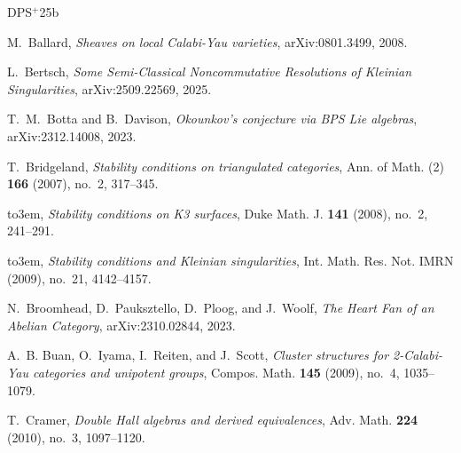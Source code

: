 \documentclass[reqno,a4paper]{amsart}
\theoremstyle{basic-theorem}
\numberwithin{equation}{section}
\begin{document}
\newcommand{\etalchar}[1]{$^{#1}$}
\providecommand{\noopsort}[1]{}
\providecommand{\bysame}{\leavevmode\hbox to3em{\hrulefill}\thinspace}
\providecommand{\href}[2]{#2}
\begin{thebibliography}{DPS{\etalchar{+}}25b}
	
	M.~Ballard, \textit{Sheaves on local {C}alabi-{Y}au varieties},
	\href{https://arxiv.org/pdf/0801.3499.pdf}{\sf arXiv:0801.3499}, 2008.
	
	L.~Bertsch, \textit{Some {{Semi-Classical Noncommutative Resolutions}} of
		{{Kleinian Singularities}}}, \href{https://arxiv.org/pdf/2509.22569.pdf}{\sf
		arXiv:2509.22569}, 2025.
		
	T.~M.~Botta and B.~Davison, \textit{Okounkov's conjecture via BPS Lie algebras},
	\href{https://arxiv.org/abs/2312.14008}{\sf arXiv:2312.14008}, 2023.	
		
	T.~Bridgeland, \textit{Stability conditions on triangulated categories}, Ann. of
	Math. (2) \textbf{166} (2007), no.~2, 317--345.
	
	\bysame, \textit{Stability conditions on {{K3}} surfaces}, Duke Math. J.
	\textbf{141} (2008), no.~2, 241--291.
	
	\bysame, \textit{Stability conditions and {K}leinian singularities}, Int.
	Math. Res. Not. IMRN (2009), no.~21, 4142--4157.
	
	
	N.~Broomhead, D.~Pauksztello, D.~Ploog, and J.~Woolf, \textit{The {H}eart {F}an
	of an {A}belian {C}ategory}, \href{https://arxiv.org/abs/2310.02844}{\sf
	arXiv:2310.02844}, 2023.
		
	A.~B. Buan, O.~Iyama, I.~Reiten, and J.~Scott, \textit{Cluster structures for
		2-{C}alabi-{Y}au categories and unipotent groups}, Compos. Math. \textbf{145}
	(2009), no.~4, 1035--1079.
	
	T.~Cramer, \textit{Double {H}all algebras and derived equivalences}, Adv. Math.
	\textbf{224} (2010), no.~3, 1097--1120.
	
	

\end{thebibliography}
\end{document}
